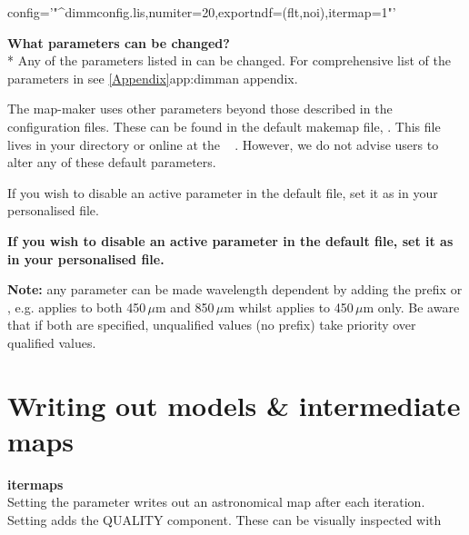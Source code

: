 \documentclass[11pt,oneside,chapters]{starlink}
\begin{document}
\begin{terminalv}
config='"^dimmconfig.lis,numiter=20,exportndf=(flt,noi),itermap=1"'
\end{terminalv}

\textbf{What parameters can be changed?}\\*
Any of the parameters listed in  can be
changed. For comprehensive list of the parameters in
 see \cref{Appendix}{app:dimm}{an appendix}.

The map-maker uses other parameters beyond those described in the
configuration files. These can be found in the default makemap file,
. This file lives in your 
directory or online at the \starlink\ 
.
 However, we do not advise users to alter any of these default parameters.

\begin{tip}
If you wish to disable an active parameter in the default file,
set it as  in your personalised file.
\end{tip}

\begin{htmlonly}
\textbf{If you wish to disable an active parameter in the default
file, set it as  in your personalised file.}
\end{htmlonly}


\textbf{Note:} any parameter can be made wavelength dependent by
adding the prefix  or , e.g.
 applies to both 450\,$\mu$m and
850\,$\mu$m whilst  applies to
450\,$\mu$m only. Be aware that if both are specified, unqualified
values (no prefix) take priority over qualified values.

\section{Writing out models \& intermediate maps}


\textbf{itermaps}\\
Setting the parameter  writes out an astronomical map after each
iteration. Setting  adds the QUALITY component.
These can be visually inspected with
\end{document}
